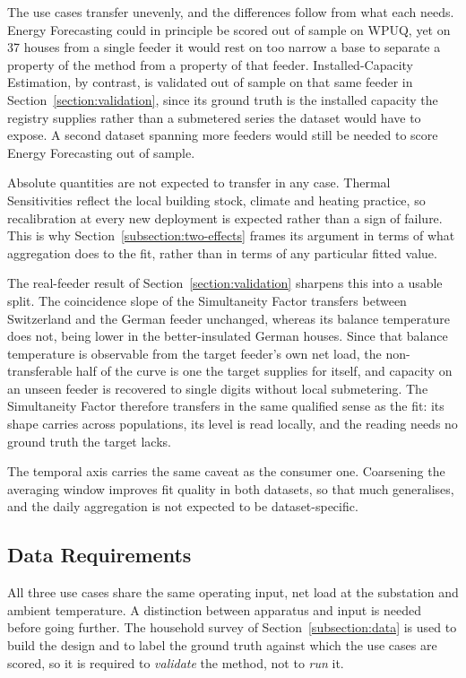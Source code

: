 \documentclass[9pt,journal,a4]{IEEEtran}
\begin{document}
The use cases transfer unevenly, and the differences follow from what each needs. Energy Forecasting could in principle be scored out of sample on WPUQ, yet on 37 houses from a single feeder it would rest on too narrow a base to separate a property of the method from a property of that feeder. Installed-Capacity Estimation, by contrast, is validated out of sample on that same feeder in Section~\ref{section:validation}, since its ground truth is the installed capacity the registry supplies rather than a submetered series the dataset would have to expose. A second dataset spanning more feeders would still be needed to score Energy Forecasting out of sample.

Absolute quantities are not expected to transfer in any case. Thermal Sensitivities reflect the local building stock, climate and heating practice, so recalibration at every new deployment is expected rather than a sign of failure. This is why Section~\ref{subsection:two-effects} frames its argument in terms of what aggregation does to the fit, rather than in terms of any particular fitted value.

The real-feeder result of Section~\ref{section:validation} sharpens this into a usable split. The coincidence slope of the Simultaneity Factor transfers between Switzerland and the German feeder unchanged, whereas its balance temperature does not, being lower in the better-insulated German houses. Since that balance temperature is observable from the target feeder's own net load, the non-transferable half of the curve is one the target supplies for itself, and capacity on an unseen feeder is recovered to single digits without local submetering. The Simultaneity Factor therefore transfers in the same qualified sense as the fit: its shape carries across populations, its level is read locally, and the reading needs no ground truth the target lacks.

The temporal axis carries the same caveat as the consumer one. Coarsening the averaging window improves fit quality in both datasets, so that much generalises, and the daily aggregation is not expected to be dataset-specific.

\subsection{Data Requirements}

All three use cases share the same operating input, net load at the substation and ambient temperature. A distinction between apparatus and input is needed before going further. The household survey of Section~\ref{subsection:data} is used to build the design and to label the ground truth against which the use cases are scored, so it is required to \emph{validate} the method, not to \emph{run} it.
\end{document}
